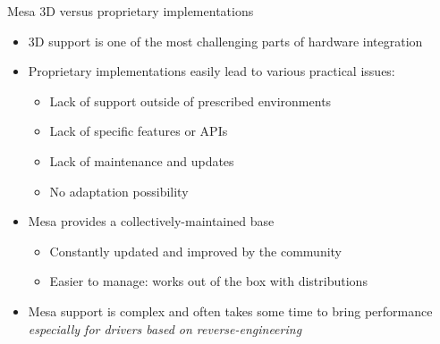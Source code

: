 \begin{frame}{Mesa 3D versus proprietary implementations}
  \begin{itemize}
  \item 3D support is one of the most challenging parts of hardware integration
  \item Proprietary implementations easily lead to various practical issues:
    \begin{itemize}
    \item Lack of support outside of prescribed environments
    \item Lack of specific features or APIs
    \item Lack of maintenance and updates
    \item No adaptation possibility
    \end{itemize}
  \item Mesa provides a collectively-maintained base
    \begin{itemize}
    \item Constantly updated and improved by the community
    \item Easier to manage: works out of the box with distributions
    \end{itemize}
  \item Mesa support is complex and often takes some time to bring performance\\
    \textit{especially for drivers based on reverse-engineering}
  \end{itemize}
\end{frame}

